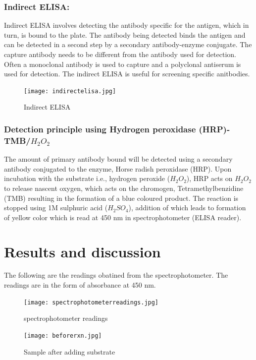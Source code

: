 \documentclass{report}
\begin{document}
\subsubsection*{Indirect ELISA:}
Indirect ELISA involves detecting the antibody specific for the antigen, which in turn, is bound to the plate.
 The antibody being detected binds the antigen and can be detected in a second step by a secondary antibody-enzyme conjugate. 
 The capture antibody needs to be different from the antibody used for detection. Often a monoclonal antibody is used to 
capture and a polyclonal antiserum is used for detection.
The indirect ELISA is useful for screening specific anitbodies.
  \begin{figure}[htbp]  
   \centering 
   \texttt{[image: indirectelisa.jpg]} 
   \caption{Indirect ELISA}
   \label{fig: Indirect ELISA } 
  \end{figure}

  \vspace{2cm}

\subsubsection*{Detection principle using Hydrogen peroxidase (HRP)-TMB/$H_{2}O_{2}$ }
The amount of primary antibody bound will be detected using a secondary antibody conjugated to the 
enzyme, Horse radish peroxidase (HRP). Upon incubation with the substrate i.e., hydrogen peroxide ($H_{2}O_{2}$),
 HRP acts on $H_{2}O_{2}$ to release nascent oxygen, which acts on the chromogen, Tetramethylbenzidine (TMB) resulting 
 in the formation of a blue coloured product. The reaction is stopped using 1M sulphuric acid ($H_{2}SO_{4}$), addition 
 of which leads to formation of yellow color which is read at 450 nm in spectrophotometer (ELISA reader).
 


\section*{Results and discussion}
The following are the readings obatined from the spectrophotometer. The readings are in the form of absorbance at 450 nm.


\begin{figure}[htbp]  
  \centering 
  \texttt{[image: spectrophotometerreadings.jpg]} 
  \caption{spectrophotometer readings}
  \label{fig: readings } 
 \end{figure}
 
  \begin{figure}[htbp]  
    \centering 
    \texttt{[image: beforerxn.jpg]} 
    \caption{Sample after adding substrate}
    \label{fig: sample with substrate }
  \end{figure}
\end{document}

